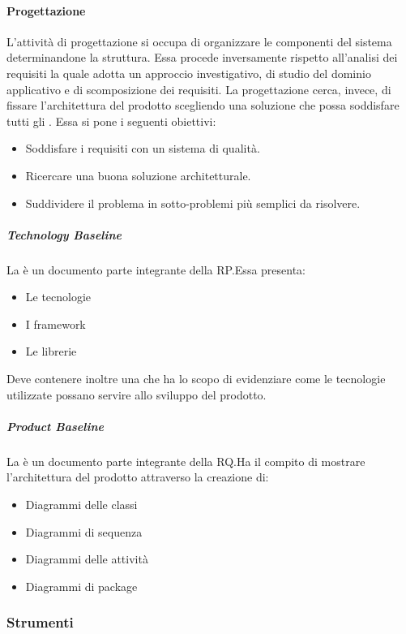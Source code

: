 \documentclass[../norme-di-progetto.tex]{subfiles}
\begin{document}
\paragraph{Progettazione}%
\label{par:progettazione}
L'attività di progettazione si occupa di organizzare le componenti del sistema determinandone la struttura. Essa procede inversamente rispetto all'analisi dei requisiti la quale adotta un approccio investigativo, di studio del dominio applicativo e di scomposizione dei requisiti. La progettazione cerca, invece, di fissare l'architettura del prodotto scegliendo una soluzione che possa soddisfare tutti gli .
Essa si pone i seguenti obiettivi:
\begin{itemize}
  \item Soddisfare i requisiti con un sistema di qualità.
  \item Ricercare una buona soluzione architetturale.
  \item Suddividere il problema in sotto-problemi più semplici da risolvere.
\end{itemize}

\subparagraph{Technology Baseline}%
\label{subp:technology_baseline}
La  è un documento parte integrante della RP.\@ Essa presenta:

\begin{itemize}
  \item Le tecnologie
  \item I framework
  \item Le librerie
\end{itemize}
Deve contenere inoltre una  che ha lo scopo di evidenziare come le tecnologie utilizzate possano servire allo sviluppo del prodotto.

\subparagraph{Product Baseline}%
\label{subp:product_baseline}
La  è un documento parte integrante della RQ.\@ Ha il compito di mostrare l'architettura del prodotto attraverso la creazione di:

\begin{itemize}
  \item Diagrammi delle classi
  \item Diagrammi di sequenza
  \item Diagrammi delle attività
  \item Diagrammi di package
\end{itemize}

\subsubsection{Strumenti}%
\label{subs:strumenti}
\end{document}
